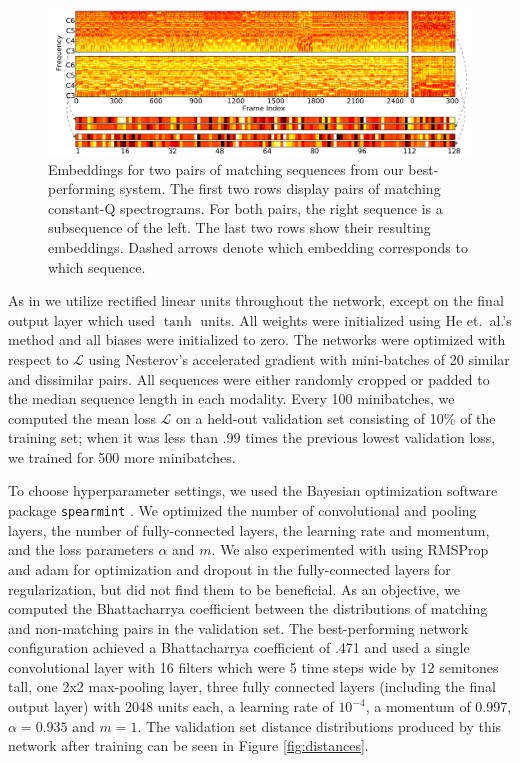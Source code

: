 \documentclass{article}
\begin{document}
\begin{figure}[htb!]
  \centering
  \includegraphics[width=\textwidth]{embeddings.pdf}
  \caption{Embeddings for two pairs of matching sequences from our best-performing system.  The first two rows display pairs of matching constant-Q spectrograms.  For both pairs, the right sequence is a subsequence of the left.  The last two rows show their resulting embeddings.  Dashed arrows denote which embedding corresponds to which sequence.}
  \label{fig:embeddings}
\end{figure}

As in \cite{raffel2015large} we utilize rectified linear units throughout the network, except on the final output layer which used $\tanh$ units.
All weights were initialized using He et.\ al.'s method \cite{he2015delving} and all biases were initialized to zero.
The networks were optimized with respect to $\mathcal{L}$ using Nesterov's accelerated gradient \cite{sutskever2013importance} with mini-batches of 20 similar and dissimilar pairs.
All sequences were either randomly cropped or padded to the median sequence length in each modality.
Every 100 minibatches, we computed the mean loss $\mathcal{L}$ on a held-out validation set consisting of 10\% of the training set; when it was less than .99 times the previous lowest validation loss, we trained for 500 more minibatches.

To choose hyperparameter settings, we used the Bayesian optimization software package \texttt{spearmint} \cite{snoek2012practical}.
We optimized the number of convolutional and pooling layers, the number of fully-connected layers, the learning rate and momentum, and the loss parameters $\alpha$ and $m$.
We also experimented with using RMSProp \cite{tieleman2012lecture} and adam \cite{kingma2014adam} for optimization and dropout \cite{hinton2012improving} in the fully-connected layers for regularization, but did not find them to be beneficial.
As an objective, we computed the Bhattacharrya coefficient \cite{bhattacharyya1943measure} between the distributions of matching and non-matching pairs in the validation set.
The best-performing network configuration achieved a Bhattacharrya coefficient of .471 and used a single convolutional layer with 16 filters which were 5 time steps wide by 12 semitones tall, one 2x2 max-pooling layer, three fully connected layers (including the final output layer) with 2048 units each, a learning rate of $10^{-4}$, a momentum of 0.997, $\alpha = 0.935$ and $m = 1$.
The validation set distance distributions produced by this network after training can be seen in Figure \ref{fig:distances}.
\end{document}
